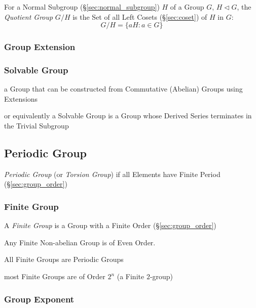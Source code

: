 For a Normal Subgroup (\S\ref{sec:normal_subgroup}) $H$ of a Group
$G$, $H \triangleleft G$, the \emph{Quotient Group} $G/H$ is the Set
of all Left Cosets (\S\ref{sec:coset}) of $H$ in $G$:
\[
    G/H = \{ aH : a \in G \}
\]



\subsubsection{Group Extension}\label{sec:group_extension}

\subsubsection{Solvable Group}\label{sec:solvable_group}

a Group that can be constructed from Commutative (Abelian) Groups using
Extensions

or equivalently a Solvable Group is a Group whose Derived Series terminates in
the Trivial Subgroup



\subsection{Periodic Group}\label{sec:periodic_group}

\emph{Periodic Group} (or \emph{Torsion Group}) if all Elements have
Finite Period (\S\ref{sec:group_order})



\subsubsection{Finite Group}\label{sec:finite_group}

A \emph{Finite Group} is a Group with a Finite Order (\S\ref{sec:group_order})

Any Finite Non-abelian Group is of Even Order.

All Finite Groups are Periodic Groups

most Finite Groups are of Order $2^n$ (a Finite $2$-group)



\subsubsection{Group Exponent}\label{sec:group_exponent}



